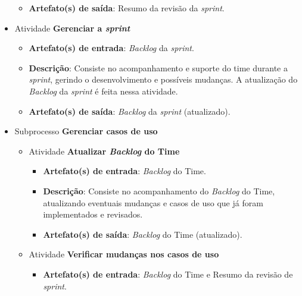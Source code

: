 \begin{itemize}
\begin{itemize}
	    \item \textbf{Artefato(s) de saída}: Resumo da revisão da \textit{sprint}.
		  
	  \end{itemize}
	  
      \item Atividade \textbf{Gerenciar a \textit{sprint}}
      
	  \begin{itemize}
	    \item \textbf{Artefato(s) de entrada}: \textit{Backlog} da \textit{sprint}.
	    
	    \item \textbf{Descrição}: Consiste no acompanhamento e suporte do time durante a \textit{sprint},
	      gerindo o desenvolvimento e possíveis mudanças. A atualização do \textit{Backlog} da \textit{sprint} é feita 
	      nessa atividade.
	    
	    \item \textbf{Artefato(s) de saída}: \textit{Backlog} da \textit{sprint} (atualizado).
		  
	  \end{itemize}
	
     \item Subprocesso \textbf{Gerenciar casos de uso}
     
	\begin{itemize}
	 
	 \item Atividade \textbf{Atualizar \textit{Backlog} do Time}
	    
	    \begin{itemize}
	      \item \textbf{Artefato(s) de entrada}: \textit{Backlog} do Time.

	      \item \textbf{Descrição}: Consiste no acompanhamento do \textit{Backlog} do Time, atualizando eventuais
		mudanças e casos de uso que já foram implementados e revisados.
	      
	      \item \textbf{Artefato(s) de saída}: \textit{Backlog} do Time (atualizado).
		    
	    \end{itemize}
	    
	 \item Atividade \textbf{Verificar mudanças nos casos de uso}
	    
	    \begin{itemize}
	      \item \textbf{Artefato(s) de entrada}: \textit{Backlog} do Time e Resumo da revisão de \textit{sprint}.


\end{itemize}
\end{itemize}
\end{itemize}

